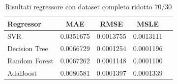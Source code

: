 \begin{table}[H]
    \centering
    \begin{tabular}{|>{\centering\arraybackslash}m{5cm}|c|c|c|c|}
        \hline
        \textbf{Regressor} & \textbf{MAE} & \textbf{RMSE} & \textbf{MSLE} \\ [10pt]
        \hline
        SVR & 0.0351675 & 0.0013755 & 0.0013111 \\ [10pt]
        \hline
        Decision Tree & 0.0066729 & 0.0001254 & 0.0001196 \\ [10pt]
        \hline
        Random Forest & 0.0067262 & 0.0001148 & 0.0001100 \\ [10pt]
        \hline
        AdaBoost & 0.0080581 & 0.0001397 & 0.0001339 \\ [10pt]
        \hline
    \end{tabular}
    \caption{Risultati regressore con dataset completo ridotto 70/30}
    \label{tab:results}
\end{table}

